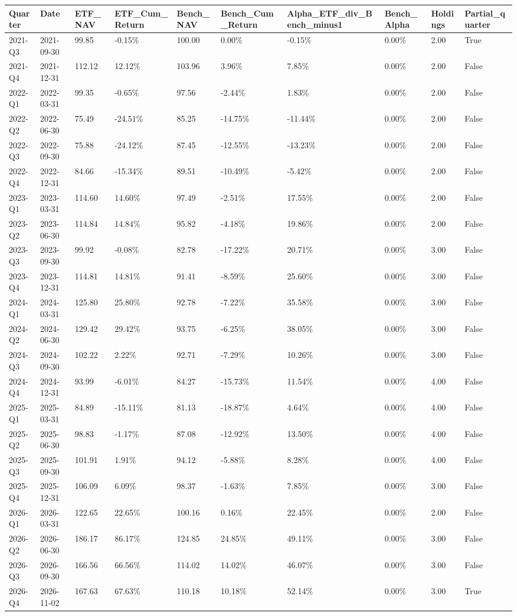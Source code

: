 \begin{longtable}{llllllllll}
Quarter & Date & ETF\_NAV & ETF\_Cum\_Return & Bench\_NAV & Bench\_Cum\_Return & Alpha\_ETF\_div\_Bench\_minus1 & Bench\_Alpha & Holdings & Partial\_quarter \\
\hline
2021-Q3 & 2021-09-30 & 99.85 & -0.15\% & 100.00 & 0.00\% & -0.15\% & 0.00\% & 2.00 & True \\
2021-Q4 & 2021-12-31 & 112.12 & 12.12\% & 103.96 & 3.96\% & 7.85\% & 0.00\% & 2.00 & False \\
2022-Q1 & 2022-03-31 & 99.35 & -0.65\% & 97.56 & -2.44\% & 1.83\% & 0.00\% & 2.00 & False \\
2022-Q2 & 2022-06-30 & 75.49 & -24.51\% & 85.25 & -14.75\% & -11.44\% & 0.00\% & 2.00 & False \\
2022-Q3 & 2022-09-30 & 75.88 & -24.12\% & 87.45 & -12.55\% & -13.23\% & 0.00\% & 2.00 & False \\
2022-Q4 & 2022-12-31 & 84.66 & -15.34\% & 89.51 & -10.49\% & -5.42\% & 0.00\% & 2.00 & False \\
2023-Q1 & 2023-03-31 & 114.60 & 14.60\% & 97.49 & -2.51\% & 17.55\% & 0.00\% & 2.00 & False \\
2023-Q2 & 2023-06-30 & 114.84 & 14.84\% & 95.82 & -4.18\% & 19.86\% & 0.00\% & 2.00 & False \\
2023-Q3 & 2023-09-30 & 99.92 & -0.08\% & 82.78 & -17.22\% & 20.71\% & 0.00\% & 3.00 & False \\
2023-Q4 & 2023-12-31 & 114.81 & 14.81\% & 91.41 & -8.59\% & 25.60\% & 0.00\% & 3.00 & False \\
2024-Q1 & 2024-03-31 & 125.80 & 25.80\% & 92.78 & -7.22\% & 35.58\% & 0.00\% & 3.00 & False \\
2024-Q2 & 2024-06-30 & 129.42 & 29.42\% & 93.75 & -6.25\% & 38.05\% & 0.00\% & 3.00 & False \\
2024-Q3 & 2024-09-30 & 102.22 & 2.22\% & 92.71 & -7.29\% & 10.26\% & 0.00\% & 3.00 & False \\
2024-Q4 & 2024-12-31 & 93.99 & -6.01\% & 84.27 & -15.73\% & 11.54\% & 0.00\% & 4.00 & False \\
2025-Q1 & 2025-03-31 & 84.89 & -15.11\% & 81.13 & -18.87\% & 4.64\% & 0.00\% & 4.00 & False \\
2025-Q2 & 2025-06-30 & 98.83 & -1.17\% & 87.08 & -12.92\% & 13.50\% & 0.00\% & 4.00 & False \\
2025-Q3 & 2025-09-30 & 101.91 & 1.91\% & 94.12 & -5.88\% & 8.28\% & 0.00\% & 4.00 & False \\
2025-Q4 & 2025-12-31 & 106.09 & 6.09\% & 98.37 & -1.63\% & 7.85\% & 0.00\% & 3.00 & False \\
2026-Q1 & 2026-03-31 & 122.65 & 22.65\% & 100.16 & 0.16\% & 22.45\% & 0.00\% & 2.00 & False \\
2026-Q2 & 2026-06-30 & 186.17 & 86.17\% & 124.85 & 24.85\% & 49.11\% & 0.00\% & 3.00 & False \\
2026-Q3 & 2026-09-30 & 166.56 & 66.56\% & 114.02 & 14.02\% & 46.07\% & 0.00\% & 3.00 & False \\
2026-Q4 & 2026-11-02 & 167.63 & 67.63\% & 110.18 & 10.18\% & 52.14\% & 0.00\% & 3.00 & True \\
\end{longtable}
